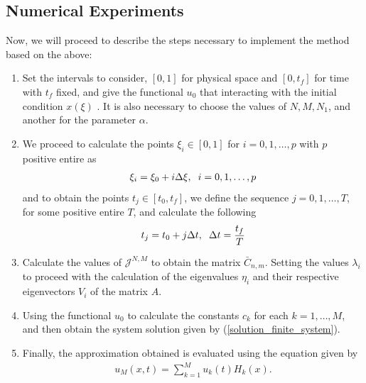 \subsection{Numerical Experiments}
    
    Now, we will proceed to describe the steps necessary to implement the method based on the above:
    \begin{enumerate}
    	\item Set the intervals to consider, $[0, 1]$ for physical space and $[0, t_f]$ for time with $t_f$ fixed, and give the functional $u_0$ that interacting with the initial condition $x(\xi)$ . It is also necessary to choose the values of $N, M, N_1$, and another for the parameter $\alpha$. 
    	
    	\item We proceed to calculate the points $\xi_i \in [0, 1]$ for $i = 0, 1, \dots, p$ with $p$ positive entire as
    	\begin{align*}
    		\xi_i = \xi_0 + i \Delta \xi, \hspace{2mm} i = 0, 1, \dots, p
    	\end{align*}
    	and to obtain the points $t_j \in [t_0, t_f]$, we define the sequence $j = 0, 1, \dots, T$, for some positive entire $T$, and calculate the following
    	\begin{align*}
    		t_j = t_0 + j \Delta t, \hspace{2mm} \Delta t = \frac{t_f}{T} 
    	\end{align*}
    	
    	\item Calculate the values of $\mathcal{J}^{N, M}$ to obtain the matrix $\bar{C}_{n, m}$. Setting the values $\lambda_i$ to proceed with the calculation of the eigenvalues $\eta_i$ and their respective eigenvectors $V_i$ of the matrix $A$.
    	
    	\item Using the functional $u_0$ to calculate the constants $c_k$ for each $k = 1, \dots, M$, and then obtain the system solution given by (\ref{solution_finite_system}).
    	
    	\item Finally, the approximation obtained is evaluated using the equation given by
    	\begin{align*}
    		u_M(x, t) = \displaystyle \sum_{k=1}^{M} u_k (t) H_k (x).
    	\end{align*}
    \end{enumerate}
    
